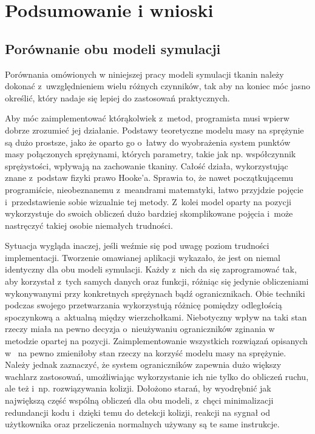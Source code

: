 \chapter{Podsumowanie i wnioski}
\label{t:wnioski}

	\section{Porównanie obu modeli symulacji}
	\label{t:wnioski:porownanie}
	
	
	Porównania omówionych w niniejszej pracy modeli symulacji tkanin należy dokonać z~uwzględnieniem wielu różnych czynników, tak aby na koniec móc jasno określić, który nadaje się lepiej do zastosowań praktycznych. 
	
	Aby móc zaimplementować którąkolwiek z~metod, programista musi wpierw dobrze zrozumieć jej działanie. Podstawy teoretyczne modelu masy na sprężynie są dużo prostsze, jako że oparto go o~łatwy do wyobrażenia system punktów masy połączonych sprężynami, których parametry, takie jak np. współczynnik sprężystości, wpływają na zachowanie tkaniny. Całość działa, wykorzystując znane z~podstaw fizyki prawo Hooke'a. Sprawia to, że nawet początkującemu programiście, nieobeznanemu z~meandrami matematyki, łatwo przyjdzie pojęcie i~przedstawienie sobie wizualnie tej metody. Z~kolei model oparty na pozycji wykorzystuje do swoich obliczeń dużo bardziej skomplikowane pojęcia i~może nastręczyć takiej osobie niemałych trudności.
	
	Sytuacja wygląda inaczej, jeśli weźmie się pod uwagę poziom trudności implementacji. Tworzenie omawianej aplikacji wykazało, że jest on niemal identyczny dla obu modeli symulacji. Każdy z~nich da się zaprogramować tak, aby korzystał z~tych samych danych oraz funkcji, różniąc się jedynie obliczeniami wykonywanymi przy konkretnych sprężynach bądź ogranicznikach. Obie techniki podczas swojego przetwarzania wykorzystują różnicę pomiędzy odległością spoczynkową a~aktualną między wierzchołkami. Niebotyczny wpływ na taki stan rzeczy miała na pewno decyzja o~nieużywaniu ograniczników zginania w metodzie opartej na pozycji. Zaimplementowanie wszystkich rozwiązań opisanych w~\cite{posbased} na pewno zmieniłoby stan rzeczy na korzyść modelu masy na sprężynie. Należy jednak zaznaczyć, że system ograniczników zapewnia dużo większy wachlarz zastosowań, umożliwiając wykorzystanie ich nie tylko do obliczeń ruchu, ale też i~np. rozwiązywania kolizji. Dołożono starań, by wyodrębnić jak największą część wspólną obliczeń dla obu modeli, z~chęci minimalizacji redundancji kodu i~dzięki temu do detekcji kolizji, reakcji na sygnał od użytkownika oraz przeliczenia normalnych używany są te same instrukcje.
	
